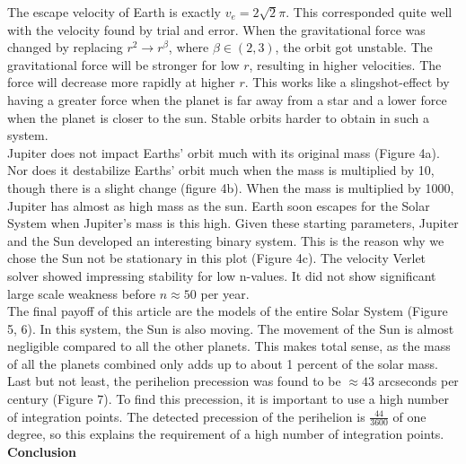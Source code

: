 \documentclass[10pt,a4paper]{article}
\begin{document}
\noindent The escape velocity of Earth is exactly $v_e=2\sqrt{2}\pi$. This corresponded quite well with the velocity found by trial and error. When the gravitational force was changed by replacing $r^2\rightarrow r^\beta$, where $\beta \in(2,3)$, the orbit got unstable. The gravitational force will be stronger for low $r$, resulting in higher velocities. The force will decrease more rapidly at higher $r$. This works like a slingshot-effect by having a greater force when the planet is far away from a star and a lower force when the planet is closer to the sun. Stable orbits harder to obtain in such a system.\\


\noindent Jupiter does not impact Earths' orbit much with its original mass (Figure 4a). Nor does it destabilize Earths' orbit much when the mass is multiplied by 10, though there is a slight change (figure 4b). When the mass is multiplied by 1000, Jupiter has almost as high mass as the sun. Earth soon escapes for the Solar System when Jupiter's mass is this high. Given these starting parameters, Jupiter and the Sun developed an interesting binary system. This is the reason why we chose the Sun not be stationary in this plot (Figure 4c). The velocity Verlet solver showed impressing stability for low n-values. It did not show significant large scale weakness before $n\approx 50$ per year.\\

\noindent The final payoff of this article are the models of the entire Solar System (Figure 5, 6). In this system, the Sun is also moving. The movement of the Sun is almost negligible compared to all the other planets. This makes total sense, as the mass of all the planets combined only adds up to about 1 percent of the solar mass.\\ 

\noindent Last but not least, the perihelion precession was found to be $\approx 43$ arcseconds per century (Figure 7). To find this precession, it is important to use a high number of integration points. The detected precession of the perihelion is $\frac{44}{3600}$ of one degree, so this explains the requirement of a high number of integration points. \\






\newpage
{\LARGE\bf
Conclusion
}\\
\end{document}
